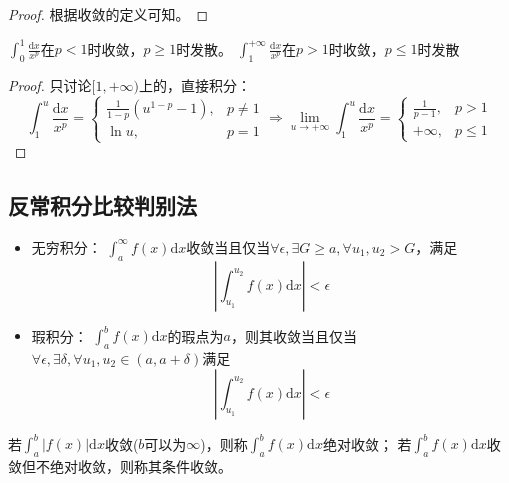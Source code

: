 \begin{proof}
  根据收敛的定义可知。
\end{proof}

\begin{theorem}
  $\int_0^1 \frac{\mathrm{d} x}{x^p}$在$p < 1$时收敛，$p \geq 1$时发散。
  $\int_1^{+\infty} \frac{\mathrm{d} x}{x^p}$在$p > 1$时收敛，$p \leq 1$时发散
\end{theorem}

\begin{proof}
  只讨论$[1,+\infty)$上的，直接积分：
  \begin{equation*}
    \int_1^u \frac{\mathrm{d} x}{x^p} =
    \begin{cases}
      \frac{1}{1-p} (u^{1-p}-1), & p \neq 1\\
      \ln u, & p = 1
    \end{cases} \Rightarrow \lim \limits _{u \rightarrow +\infty}\int_1^u \frac{\mathrm{d} x}{x^p} =
    \begin{cases}
      \frac{1}{p-1}, & p > 1\\
      +\infty , & p \leq 1
    \end{cases}
  \end{equation*}
\end{proof}

\subsection{反常积分比较判别法}

\begin{theorem}[Cauchy收敛准则]
  \begin{itemize}
  \item 无穷积分：
    $\int^{\infty}_a f(x)\mathrm{d}x$收敛当且仅当$\forall \epsilon, \exists G \geq a, \forall u_1,u_2 > G$，满足
    \begin{equation*}
       |\int_{u_1}^{u_2}f(x)\mathrm{d}x| < \epsilon
    \end{equation*}
  \item 瑕积分：
    $\int_a^bf(x)\mathrm{d}x$的瑕点为$a$，则其收敛当且仅当$\forall \epsilon, \exists \delta, \forall u_1,u_2 \in (a,a+\delta)$满足
    \begin{equation*}
      |\int_{u_1}^{u_2}f(x)\mathrm{d}x| < \epsilon
    \end{equation*}
  \end{itemize}
\end{theorem}

\begin{definition}[绝对收敛与条件收敛]
  若$\int_a^b|f(x)|\mathrm{d}x$收敛($b$可以为$\infty$)，则称$\int_a^bf(x)\mathrm{d}x$绝对收敛；
  若$\int_a^bf(x)\mathrm{d}x$收敛但不绝对收敛，则称其条件收敛。
\end{definition}

